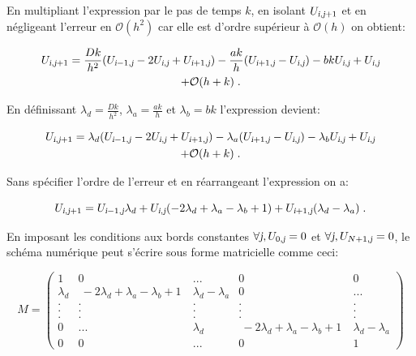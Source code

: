 \documentclass[a4paper, 12pt]{report}
\begin{document}
En multipliant l'expression par le pas de temps $k$, en isolant $U_{\textsl{i},\textsl{j}+1}$ et
en négligeant l'erreur en $\mathcal{O}(h^2)$ car elle est d'ordre supérieur à $\mathcal{O}(h)$
on obtient:

\begin{multline}
  U_{\textsl{i},\textsl{j}+1} = \frac{Dk}{h^2} (U_{\textsl{i}-1,\textsl{j}} - 2 U_{\textsl{i},\textsl{j}} + U_{\textsl{i}+1,\textsl{j}}) - \frac{ak}{h} (U_{\textsl{i}+1,\textsl{j}} - U_{\textsl{i},\textsl{j}}) - bk U_{\textsl{i},\textsl{j}} + U_{\textsl{i},\textsl{j}}\\
  + \mathcal{O}(h+k) \;.
\end{multline}

En définissant $\lambda_d = \frac{Dk}{h^2}$, $\lambda_a = \frac{ak}{h}$ et
$\lambda_b = bk$ l'expression devient:

\begin{multline}
  U_{\textsl{i},\textsl{j}+1} = \lambda_d (U_{\textsl{i}-1,\textsl{j}} - 2 U_{\textsl{i},\textsl{j}} + U_{\textsl{i}+1,\textsl{j}}) - \lambda_a (U_{\textsl{i}+1,\textsl{j}} - U_{\textsl{i},\textsl{j}}) - \lambda_b U_{\textsl{i},\textsl{j}} + U_{\textsl{i},\textsl{j}}\\
  + \mathcal{O}(h+k) \;.
\end{multline}

Sans spécifier l'ordre de l'erreur et en réarrangeant l'expression on a:

\begin{equation}
  U_{\textsl{i},\textsl{j}+1} = U_{\textsl{i}-1,\textsl{j}} \lambda_d + U_{\textsl{i},\textsl{j}} (-2 \lambda_d + \lambda_a - \lambda_b +1) + U_{\textsl{i}+1, \textsl{j}} (\lambda_d - \lambda_a)\;.
  \label{eq:schema_num_sans_erreur}
\end{equation}

En imposant les conditions aux bords constantes $\forall \textsl{j}, U_{0,\textsl{j}} = 0$
et $\forall \textsl{j}, U_{N+1,\textsl{j}} = 0$, le schéma numérique peut s'écrire
sous forme matricielle comme ceci:

\begin{equation}
  M =
  \begin{pmatrix}
     1 & 0 & ... & 0 & 0 \\
     \lambda_d & \ -2 \lambda_d + \lambda_a - \lambda_b + 1 \ & \lambda_d-\lambda_a &  0 & ...\\
     . & . & . &  . & .\\
     . & . & . &  . & .\\
     . & . & . &  . & .\\
     0 & ... & \lambda_d & \ -2 \lambda_d + \lambda_a - \lambda_b + 1 \ & \lambda_d-\lambda_a\\
     0 & 0 & ... & 0 & 1
  \end{pmatrix}
\end{equation}
\end{document}
